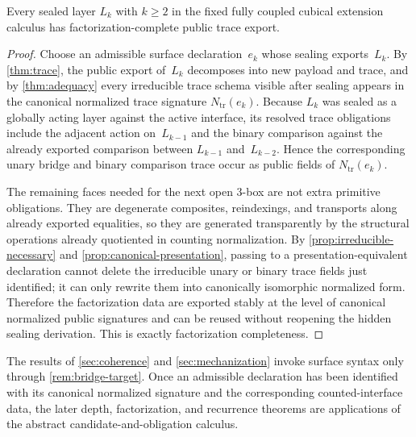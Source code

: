 \documentclass{lmcs}
\begin{document}
\begin{thm}
\label{thm:factorization-complete}
Every sealed layer $L_k$ with $k \geq 2$ in the fixed fully coupled cubical
extension calculus has factorization-complete public trace export.
\end{thm}

\begin{proof}
Choose an admissible surface declaration~$e_k$ whose sealing exports~$L_k$.
By \autoref{thm:trace}, the public export of~$L_k$ decomposes into new payload
and trace, and by \autoref{thm:adequacy} every irreducible trace schema visible
after sealing appears in the canonical normalized trace signature
$N_{\mathrm{tr}}(e_k)$. Because $L_k$ was sealed as a globally acting layer
against the active interface, its resolved trace obligations include the
adjacent action on~$L_{k-1}$ and the binary comparison against the already
exported comparison between $L_{k-1}$ and~$L_{k-2}$. Hence the corresponding
unary bridge and binary comparison trace occur as public fields of
$N_{\mathrm{tr}}(e_k)$.

The remaining faces needed for the next open $3$-box are not extra primitive
obligations. They are degenerate composites, reindexings, and transports along
already exported equalities, so they are generated transparently by the
structural operations already quotiented in counting normalization. By
\autoref{prop:irreducible-necessary} and
\autoref{prop:canonical-presentation}, passing to a presentation-equivalent
declaration cannot delete the irreducible unary or binary trace fields just
identified; it can only rewrite them into canonically isomorphic normalized
form. Therefore the factorization data are exported stably at the level of
canonical normalized public signatures and can be reused without reopening the
hidden sealing derivation. This is exactly factorization completeness.
\end{proof}

\begin{rem}
\label{rem:bridge-to-counting}
The results of \autoref{sec:coherence} and \autoref{sec:mechanization} invoke surface syntax only through \autoref{rem:bridge-target}. Once an admissible declaration has been identified with its canonical normalized signature and the corresponding counted-interface data, the later depth, factorization, and recurrence theorems are applications of the abstract candidate-and-obligation calculus.
\end{rem}
\end{document}
